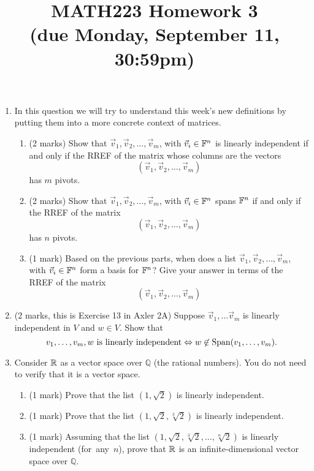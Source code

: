 \documentclass[12pt]{article}
\begin{document}
\title{MATH223 Homework 3\\ (due Monday, September 11, 30:59pm)}
\author{}
\date{}
\maketitle
{}

\begin{enumerate}
\item In this question we will try to understand this week's new definitions by putting them into a more concrete context of matrices.
  \begin{enumerate}
  \item (2 marks) Show that $\vec v_1, \vec v_2, \ldots , \vec v_m$, with $\vec v_i\in \mathbb{F}^n$ is linearly independent if and only if the RREF of the matrix whose columns are the vectors
    \[
      \left( \vec v_1 , \vec v_2, \ldots , \vec v_m \right)
    \]
    has $m$ pivots.
  \item (2 marks) Show that $\vec v_1, \vec v_2, \ldots , \vec v_m$, with $\vec v_i\in \mathbb{F}^n$ spans $\mathbb{F}^n$ if and only if the RREF of the matrix
    \[
      \left( \vec v_1 , \vec v_2, \ldots , \vec v_m \right)
    \]
    has $n$ pivots.
  \item (1 mark) Based on the previous parts, when does a list $\vec v_1, \vec v_2, \ldots , \vec v_m$, with $\vec v_i\in \mathbb{F}^n$ form a basis for $\mathbb{F}^n$? Give your answer in terms of the RREF of the matrix
    \[
      \left( \vec v_1 , \vec v_2, \ldots , \vec v_m \right)
    \]
  \end{enumerate}
\item (2 marks, this is Exercise 13 in Axler 2A) Suppose $\vec v_1,\ldots \vec v_m$ is linearly independent in $V$ and $w\in V$. Show that
  \[
    v_1,\ldots ,v_m,w\text{ is linearly independent} \Leftrightarrow w\not\in\operatorname{Span}(v_1,\ldots ,v_m).
  \]
\item Consider $\mathbb{R}$ as a vector space over $\mathbb{Q}$ (the rational numbers). You do not need to verify that it is a vector space.
  \begin{enumerate}
  \item (1 mark) Prove that the list $(1,\sqrt{2})$ is linearly independent.
  \item (1 mark) Prove that the list $(1,\sqrt{2},\sqrt[3]{2})$ is linearly independent.
  \item (1 mark) Assuming that the list $(1,\sqrt{2},\sqrt[3]{2},\ldots ,\sqrt[n]{2})$ is linearly independent \mbox{(for any $n$)}, prove that $\mathbb{R}$ is an infinite-dimensional vector space over $\mathbb{Q}$.

\end{enumerate}
\end{enumerate}
\end{document}
